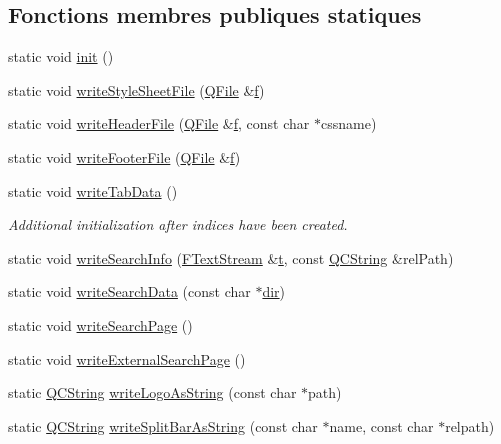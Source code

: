 \subsection*{Fonctions membres publiques statiques}
\begin{DoxyCompactItemize}
\item 
static void \hyperlink{class_html_generator_a0c4c6cd48e43f74bf258851f8b109faf}{init} ()
\item 
static void \hyperlink{class_html_generator_aa896f1b7868e05224e879ed987a122b8}{write\+Style\+Sheet\+File} (\hyperlink{class_q_file}{Q\+File} \&\hyperlink{060__command__switch_8tcl_af6830d2c644b45088ea8f1f74a46b778}{f})
\item 
static void \hyperlink{class_html_generator_af46285b4b32be613d4eece52b8b3cb45}{write\+Header\+File} (\hyperlink{class_q_file}{Q\+File} \&\hyperlink{060__command__switch_8tcl_af6830d2c644b45088ea8f1f74a46b778}{f}, const char $\ast$cssname)
\item 
static void \hyperlink{class_html_generator_acac3dc26b34a9cacb48aa1d7bc17e532}{write\+Footer\+File} (\hyperlink{class_q_file}{Q\+File} \&\hyperlink{060__command__switch_8tcl_af6830d2c644b45088ea8f1f74a46b778}{f})
\item 
static void \hyperlink{class_html_generator_a7306ef9abbceafd6074b4d883a59f033}{write\+Tab\+Data} ()
\begin{DoxyCompactList}\small\item\em Additional initialization after indices have been created. \end{DoxyCompactList}\item 
static void \hyperlink{class_html_generator_a99699bc4962554bb35a111d75b13decb}{write\+Search\+Info} (\hyperlink{class_f_text_stream}{F\+Text\+Stream} \&\hyperlink{class_output_generator_a55a40a8215efe6adc4d0a587ad9a46bc}{t}, const \hyperlink{class_q_c_string}{Q\+C\+String} \&rel\+Path)
\item 
static void \hyperlink{class_html_generator_a028225feab9ba17ccf8efe0ad3a41ee9}{write\+Search\+Data} (const char $\ast$\hyperlink{class_output_generator_ac64b8818d57bbe250f647d7b10edd45e}{dir})
\item 
static void \hyperlink{class_html_generator_a1fd6971ba73b744d9ceb90478194d61d}{write\+Search\+Page} ()
\item 
static void \hyperlink{class_html_generator_a9588784ebebaad9cb24e153c07aeb662}{write\+External\+Search\+Page} ()
\item 
static \hyperlink{class_q_c_string}{Q\+C\+String} \hyperlink{class_html_generator_a3d4f21a27792ff6872ade682475a5661}{write\+Logo\+As\+String} (const char $\ast$path)
\item 
static \hyperlink{class_q_c_string}{Q\+C\+String} \hyperlink{class_html_generator_adfceb76ea8febf729a92331ffad0cf14}{write\+Split\+Bar\+As\+String} (const char $\ast$name, const char $\ast$relpath)
\end{DoxyCompactItemize}
